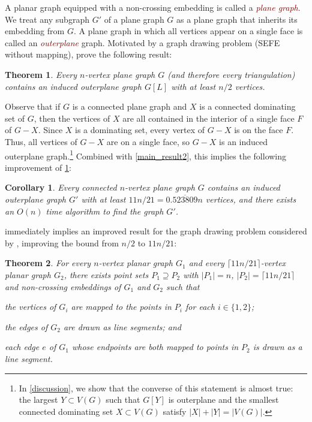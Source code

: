 \documentclass[11pt]{article}
\newtheorem{thm}{Theorem}
\newtheorem{cor}{Corollary}
\newcommand{\defin}[1]{\emph{\textcolor{Maroon}{#1}}}
\theoremstyle{definition}
\begin{document}
A planar graph equipped with a non-crossing embedding is called a \defin{plane graph}.  We treat any subgraph $G'$ of a plane graph $G$ as a plane graph that inherits its embedding from $G$. A plane graph in which all vertices appear on a single face is called an \defin{outerplane} graph.  Motivated by a graph drawing problem (SEFE without mapping), \citet{angelini.evans.ea:sefe} prove the following result:

\begin{thm}\label{induced_outerplane_orig}
    Every $n$-vertex plane graph $G$ (and therefore every triangulation) contains an induced outerplane graph $G[L]$ with at least $n/2$ vertices.
\end{thm}

Observe that if $G$ is a connected plane graph and $X$ is a connected dominating set of $G$, then the vertices of $X$ are all contained in the interior of a single face $F$ of $G-X$.  Since $X$ is a dominating set, every vertex of $G-X$ is on the face $F$.  Thus, all vertices of $G-X$ are on a single face, so $G-X$ is an induced outerplane graph.\footnote{In \cref{discussion}, we show that the converse of this statement is almost true: the largest $Y\subset V(G)$ such that $G[Y]$ is outerplane and the smallest connected dominating set $X\subset V(G)$ satisfy $|X|+|Y|=|V(G)|$.}  Combined with \cref{main_result2}, this implies the following improvement of \cref{induced_outerplane_orig}:

\begin{cor}\label{induced_outerplane_improved}
    Every connected $n$-vertex plane graph $G$ contains an induced outerplane graph $G'$ with at least $11n/21=0.\overline{523809}n$ vertices, and there exists an $O(n)$ time algorithm to find the graph $G'$.
\end{cor}

 immediately implies an improved result for the graph drawing problem considered by \citet{angelini.evans.ea:sefe}, improving the bound from $n/2$ to $11n/21$:

\begin{thm}\label{sefenomap}
  For every $n$-vertex planar graph $G_1$ and every $\lceil 11n/21\rceil$-vertex planar graph $G_2$, there exists point sets $P_1\supseteq P_2$ with $|P_1|=n$, $|P_2|=\lceil 11n/21\rceil$ and non-crossing embeddings of $G_1$ and $G_2$ such that
  \begin{compactenum}[(a)]
    \item the vertices of $G_i$ are mapped to the points in $P_i$ for each $i\in\{1,2\}$;
    \item the edges of $G_2$ are drawn as line segments; and
    \item each edge $e$ of $G_1$ whose endpoints are both mapped to points in $P_2$ is drawn as a line segment.
  \end{compactenum}
\end{thm}
\end{document}

